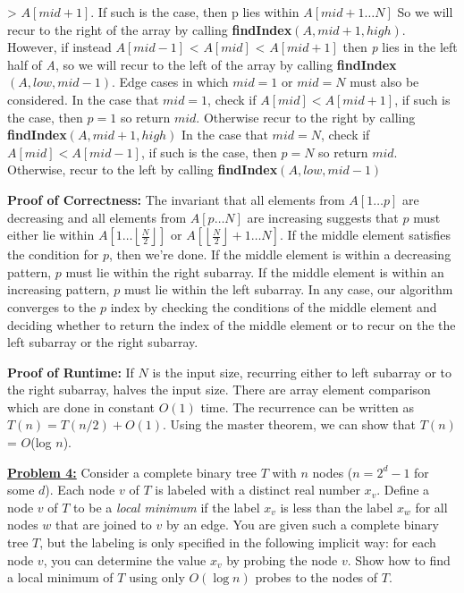 \documentclass[11pt]{article}
\begin{document}
\begin{flushleft}
		\textgreater{ $A[mid + 1]$}. If such is the case, then p lies within $A[mid + 1 \dots N]$ So we will recur to the right of the array by calling \textbf{findIndex}$(A, mid + 1, high)$.
		However, if instead $A[mid - 1]$ \textless{ $A[mid]$} \textless { $A[mid + 1]$} then \emph{p} lies in the left half of \emph{A}, so we will recur to the left of the array by calling
		\textbf{findIndex$(A, low, mid -1)$}.\newpage
		Edge cases in which $mid = 1$ or $mid = N$ must also be considered.\newline
		In the case that $mid = 1$, check if $A[mid] < A[mid + 1]$, if such is the case, then $p = 1$ so return $mid$. Otherwise recur to the right by calling \textbf{findIndex}$(A, mid + 1, high)$\newline
		In the case that $mid = N$, check if $A[mid] < A[mid - 1]$, if such is the case, then $p = N$ so return $mid$. Otherwise, recur to the left by calling \textbf{findIndex}$(A, low, mid - 1)$\newline
		  
		\textbf{Proof of Correctness:} The invariant that all elements from $A[1 \dots p]$ are decreasing and all elements from $A[p \dots N]$ are increasing suggests that $p$ must either lie within $A[1 \dots \left\lfloor\frac{N}{2}\right\rfloor]$ or 
		$A[\left\lfloor\frac{N}{2}\right\rfloor + 1 \dots N]$. \newline
		If the middle element satisfies the condition for $p$, then we're done.
		If the middle element is within a decreasing pattern, $p$ must lie within the right subarray.  
		If the middle element is within an increasing pattern, $p$ must lie within the left subarray.
		In any case, our algorithm converges to the $p$ index by checking the conditions of the middle element and deciding whether to return the index of the middle element or to recur on the the left subarray or the right subarray. \newline
		\vspace{0.2cm}
		
		\textbf{Proof of Runtime:} If $N$ is the input size, recurring either to left subarray or to the right subarray, halves the input size. There are array element comparison which are done in constant $O(1)$ time. The recurrence can be written as $T(n) = T(n / 2) + O(1)$. Using the master theorem, we can show that $T(n)$ = $O$(log $n$).
		\vspace{0.2cm}
		
		\item \textbf {\underline{Problem 4:}} Consider a complete binary tree $T$ with $n$ nodes ($n = 2^d-1$ for some $d$). Each node $v$ of $T$ is labeled with a distinct real number $x_v$. Define a node $v$ of $T$ to be a \textit{local minimum} if the label $x_v$ is less than the label $x_w$ for all nodes $w$ that are joined to $v$ by an edge. You are given such a complete binary tree $T$, but the labeling is only specified in the following implicit way: for each node $v$, you can determine the value $x_v$ by probing the node $v$. Show how to find a local minimum of $T$ using only $O(\log n)$ probes to the nodes of $T$.\newline
		

\end{flushleft}
\end{document}
